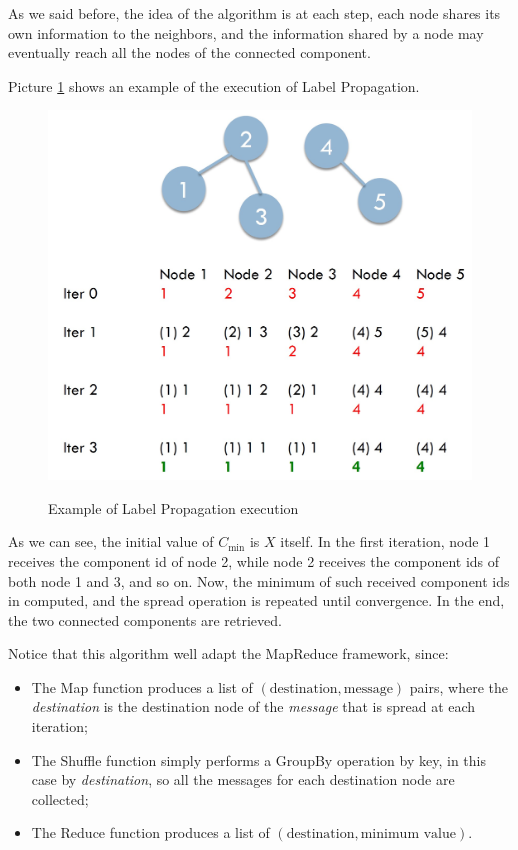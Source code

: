 As we said before, the idea of the algorithm is at each step, each node shares its own information to the neighbors, and the information shared by a node may eventually reach all the nodes of the connected component.

Picture \ref{lab prop} shows an example of the execution of Label Propagation.

\begin{figure}[h!]
		\centering
		\includegraphics[scale = 0.5]{img/label propagation.jpg}
        \label{lab prop}
        \caption{Example of Label Propagation execution}
\end{figure}

As we can see, the initial value of $C_{\text{min}}$ is $X$ itself. In the first iteration, node 1 receives the component id of node 2, while node 2 receives the component ids of both node 1 and 3, and so on. Now, the minimum of such received component ids in computed, and the spread operation is repeated until convergence. In the end, the two connected components are retrieved.

Notice that this algorithm well adapt the MapReduce framework, since:

\begin{itemize}
    \item The Map function produces a list of $(\text{destination}, \text{message})$ pairs, where the \textit{destination} is the destination node of the \textit{message} that is spread at each iteration;
    \item The Shuffle function simply performs a GroupBy operation by key, in this case by \textit{destination}, so all the messages for each destination node are collected;
    \item The Reduce function produces a list of $(\text{destination}, \text{minimum value})$.
\end{itemize}

